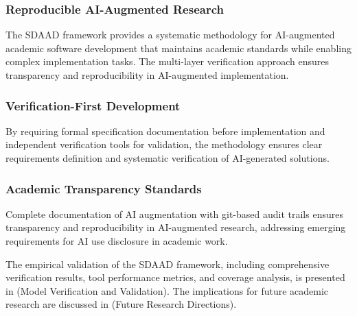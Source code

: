 \subsubsection{Reproducible AI-Augmented Research}
The SDAAD framework provides a systematic methodology for AI-augmented academic software development that maintains academic standards while enabling complex implementation tasks. The multi-layer verification approach ensures transparency and reproducibility in AI-augmented implementation.

\subsubsection{Verification-First Development}
By requiring formal specification documentation before implementation and independent verification tools for validation, the methodology ensures clear requirements definition and systematic verification of AI-generated solutions.

\subsubsection{Academic Transparency Standards}
Complete documentation of AI augmentation with git-based audit trails ensures transparency and reproducibility in AI-augmented research, addressing emerging requirements for AI use disclosure in academic work.

The empirical validation of the SDAAD framework, including comprehensive verification results, tool performance metrics, and coverage analysis, is presented in  (Model Verification and Validation). The implications for future academic research are discussed in  (Future Research Directions).
